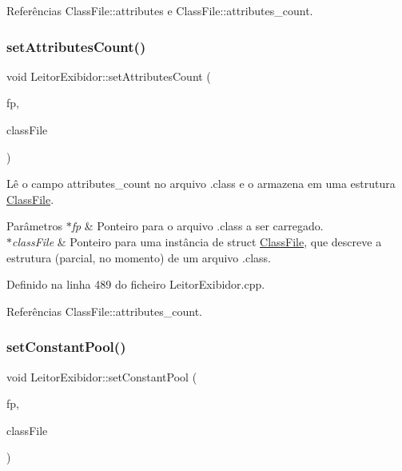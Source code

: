 Referências Class\+File\+::attributes e Class\+File\+::attributes\+\_\+count.

\mbox{\label{classLeitorExibidor_a891dc9f2ceb6f5c337f91a973d2ad6ee}} 
\subsubsection{\texorpdfstring{set\+Attributes\+Count()}{setAttributesCount()}}
{\footnotesize\ttfamily void Leitor\+Exibidor\+::set\+Attributes\+Count (\begin{DoxyParamCaption}\item[{F\+I\+LE $\ast$}]{fp,  }\item[{\hyperlink{classClassFile}{Class\+File} $\ast$}]{class\+File }\end{DoxyParamCaption})\hspace{0.3cm}{\ttfamily [private]}}

Lê o campo attributes\+\_\+count no arquivo .class e o armazena em uma estrutura \hyperlink{classClassFile}{Class\+File}. 
\begin{DoxyParams}{Parâmetros}
{\em $\ast$fp} & Ponteiro para o arquivo .class a ser carregado. \\
\hline
{\em $\ast$class\+File} & Ponteiro para uma instância de struct \hyperlink{classClassFile}{Class\+File}, que descreve a estrutura (parcial, no momento) de um arquivo .class. \\
\hline
\end{DoxyParams}


Definido na linha 489 do ficheiro Leitor\+Exibidor.\+cpp.



Referências Class\+File\+::attributes\+\_\+count.

\mbox{\label{classLeitorExibidor_a34dc148775506753f609e643ac931cac}} 
\subsubsection{\texorpdfstring{set\+Constant\+Pool()}{setConstantPool()}}
{\footnotesize\ttfamily void Leitor\+Exibidor\+::set\+Constant\+Pool (\begin{DoxyParamCaption}\item[{F\+I\+LE $\ast$}]{fp,  }\item[{\hyperlink{classClassFile}{Class\+File} $\ast$}]{class\+File }\end{DoxyParamCaption})\hspace{0.3cm}{\ttfamily [private]}}

